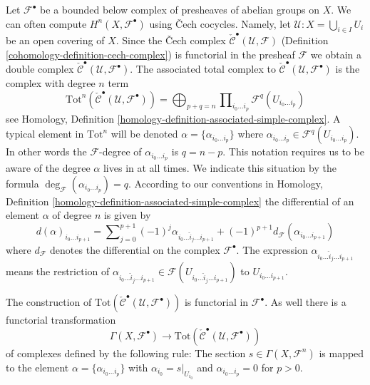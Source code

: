 \medskip\noindent
Let ${\mathcal F}^\bullet$ be a bounded below complex of presheaves of abelian
groups on $X$. We can often compute $H^n(X, {\mathcal F}^\bullet)$
using {\v C}ech cocycles. Namely, let
${\mathcal U} : X = \bigcup_{i \in I} U_i$
be an open covering of $X$. Since the {\v C}ech complex
$\check{\mathcal{C}}^\bullet(\mathcal{U}, \mathcal{F})$
(Definition \ref{cohomology-definition-cech-complex})
is functorial in the presheaf $\mathcal{F}$ we obtain a double complex
$\check{\mathcal{C}}^\bullet(\mathcal{U}, \mathcal{F}^\bullet)$.
The associated total complex to
$\check{\mathcal{C}}^\bullet({\mathcal U}, {\mathcal F}^\bullet)$
is the complex with degree $n$ term
$$
\text{Tot}^n(\check{\mathcal{C}}^\bullet({\mathcal U}, {\mathcal F}^\bullet))
=
\bigoplus\nolimits_{p + q = n}
\prod\nolimits_{i_0\ldots i_p} {\mathcal F}^q(U_{i_0\ldots i_p})
$$
see
Homology, Definition \ref{homology-definition-associated-simple-complex}.
A typical element in $\text{Tot}^n$ will be denoted
$\alpha = \{\alpha_{i_0\ldots i_p}\}$ where
$\alpha_{i_0 \ldots i_p} \in \mathcal{F}^q(U_{i_0\ldots i_p})$.
In other words the $\mathcal{F}$-degree of $\alpha_{i_0\ldots i_p}$ is
$q = n - p$. This notation requires us to be aware of the degree $\alpha$
lives in at all times. We indicate this situation by the formula
$\deg_{\mathcal F}(\alpha_{i_0\ldots i_p}) = q$.
According to our conventions in
Homology, Definition \ref{homology-definition-associated-simple-complex}
the differential of an element $\alpha$ of degree $n$ is given by
$$
d(\alpha)_{i_0\ldots i_{p + 1}}
=
\sum\nolimits_{j = 0}^{p + 1}
(-1)^j \alpha_{i_0 \ldots \hat i_j \ldots i_{p + 1}} +
(-1)^{p + 1}d_{{\mathcal F}}(\alpha_{i_0 \ldots i_{p + 1}})
$$
where $d_\mathcal{F}$ denotes the differential on the complex
$\mathcal{F}^\bullet$.
The expression $\alpha_{i_0 \ldots \hat i_j \ldots i_{p + 1}}$ means the
restriction of $\alpha_{i_0 \ldots \hat i_j \ldots i_{p + 1}}
\in {\mathcal F}(U_{i_0\ldots\hat i_j\ldots i_{p + 1}})$ to
$U_{i_0 \ldots i_{p + 1}}$.

\medskip\noindent
The construction of
$\text{Tot}(\check{\mathcal{C}}^\bullet({\mathcal U}, {\mathcal F}^\bullet))$
is functorial in ${\mathcal F}^\bullet$. As well there is a functorial
transformation
\begin{equation}
\label{equation-global-sections-to-cech}
\Gamma(X, {\mathcal F}^\bullet)
\longrightarrow
\text{Tot}(\check{\mathcal{C}}^\bullet({\mathcal U}, {\mathcal F}^\bullet))
\end{equation}
of complexes defined by the following rule: The section
$s\in \Gamma(X, {\mathcal F}^n)$
is mapped to the element $\alpha = \{\alpha_{i_0\ldots i_p}\}$
with $\alpha_{i_0} = s|_{U_{i_0}}$ and $\alpha_{i_0\ldots i_p} = 0$
for $p > 0$.

